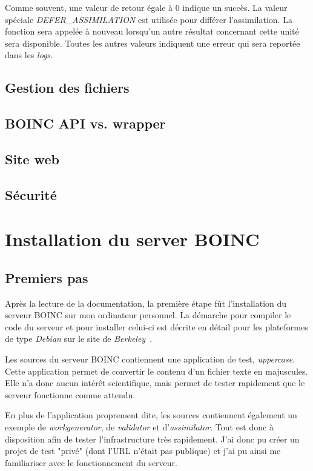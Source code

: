 \documentclass[a4paper, 11pt]{article}
\begin{document}
Comme souvent, une valeur de retour égale à 0 indique un succès. La valeur spéciale \textit{DEFER\_ASSIMILATION} est utilisée pour différer l'assimilation. La fonction sera appelée à nouveau lorsqu'un autre résultat concernant cette unité sera disponible. Toutes les autres valeurs indiquent une erreur qui sera reportée dans les \textit{logs}.

\subsection{Gestion des fichiers}

\subsection{BOINC API vs. wrapper}


\subsection{Site web}

\subsection{Sécurité}


\section{Installation du server BOINC}

\subsection{Premiers pas}
Après la lecture de la documentation, la première étape fût l'installation du serveur \textsc{BOINC} sur mon ordinateur personnel. La démarche pour compiler le code du serveur et pour installer celui-ci est décrite en détail pour les plateformes de type \textit{Debian} sur le site de \textit{Berkeley}~\cite{BOINC}.

Les sources du serveur \textsc{BOINC} contiennent une application de test, \textit{uppercase}. Cette application permet de convertir le contenu d'un fichier texte en majuscules. Elle n'a donc aucun intérêt scientifique, mais permet de tester rapidement que le serveur fonctionne comme attendu.

En plus de l'application proprement dite, les sources contiennent également un exemple de \textit{workgenerator}, de \textit{validator} et d'\textit{assimilator}. Tout est donc à disposition afin de tester l'infrastructure très rapidement. J'ai donc pu créer un projet de test "privé" (dont l'URL n'était pas publique) et j'ai pu ainsi me familiariser avec le fonctionnement du serveur.
\end{document}
